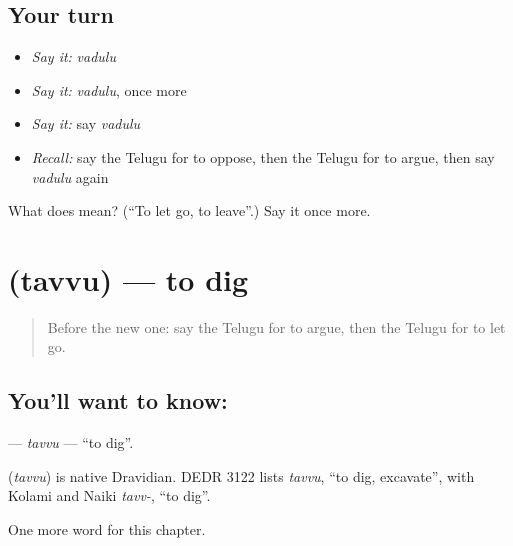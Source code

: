 \subsection*{Your turn}
\begin{itemize}
\raggedright
  \item \emph{Say it:} \emph{vadulu}
  \item \emph{Say it:} \emph{vadulu}, once more
  \item \emph{Say it:} say \emph{vadulu}
  \item \emph{Recall:} say the Telugu for to oppose, then the Telugu for to argue, then say \emph{vadulu} again
\end{itemize}

\begin{tcolorbox}[breakable,colback=teal!4,colframe=teal!35!black,title={Before you move on}]
What does  mean? (\textquotedblleft{}To let go, to leave\textquotedblright{}.) Say it once more.
\end{tcolorbox}
\section[\texorpdfstring{\te{తవ్వు} (tavvu)}{తవ్వు (tavvu)}]{ (tavvu) — to dig}

\label{lesson:TE-C284-tavvu}



\begin{quote}
Before the new one: say the Telugu for to argue, then the Telugu for to let go.
\end{quote}

\subsection*{You'll want to know: }
\textbf{} — \emph{tavvu} — \textquotedblleft{}to dig\textquotedblright{}.

\begin{cousinweb}
\textbf{} (\emph{tavvu}) is native Dravidian. DEDR 3122 lists \emph{tavvu}, \textquotedblleft{}to dig, excavate\textquotedblright{}, with Kolami and Naiki \emph{tavv-}, \textquotedblleft{}to dig\textquotedblright{}.
\end{cousinweb}

\begin{grammarlens}[title={What you've built}]
One more word for this chapter.
\end{grammarlens}

